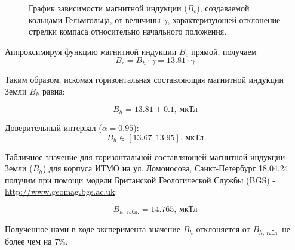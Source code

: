 \documentclass[12pt, a4paper]{article}
\begin{document}
\begin{figure}[H]
\centering
{}
\caption{График зависимости магнитной индукции ($B_c$), создаваемой кольцами Гельмгольца, от величины $\gamma$, характеризующей отклонение стрелки компаса относительно начального положения. }
\label{gr:1}
\end{figure}

Аппроксимируя функцию магнитной индукции $B_c$ прямой, получаем \[ B_c = B_h \cdot \gamma =  13.81\cdot \gamma\]

Таким образом, искомая горизонтальная составляющая магнитной индукции Земли $B_h$ равна:

\[B_h = 13.81 \pm 0.1 \text{, мкТл}\]

Доверительный интервал ($\alpha=0.95$):
\[ B_h \in \left[13.67; 13.95 \right] \text{, мкТл} \]

Табличное значение для горизонтальной составляющей магнитной индукции Земли ($B_h$) для корпуса ИТМО на ул. Ломоносова, Санкт-Петербург 18.04.24 получим при помощи модели Британской Геологической Службы (BGS) - \href{http://www.geomag.bgs.ac.uk/data_service/models_compass/wmm_calc.html }{http://www.geomag.bgs.ac.uk}:

\[B_{h\text{, табл.}} = 14.765 \text{, мкТл}\]

Полученное нами в ходе эксперимента значение $B_h$ отклоняется от $B_{h\text{, табл.}}$ не более чем на $7 \%$.

\newpage
\end{document}
